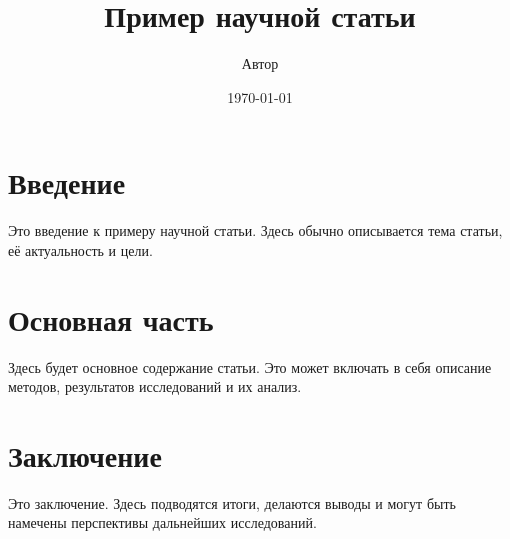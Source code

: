 \documentclass{article}
\title{Пример научной статьи}
\author{Автор}
\date{\today}
\begin{document}
\maketitle

\section{Введение}

Это введение к примеру научной статьи. Здесь обычно описывается тема статьи, её актуальность и цели.

\section{Основная часть}

Здесь будет основное содержание статьи. Это может включать в себя описание методов, результатов исследований и их анализ.

\section{Заключение}

Это заключение. Здесь подводятся итоги, делаются выводы и могут быть намечены перспективы дальнейших исследований.
\end{document}
